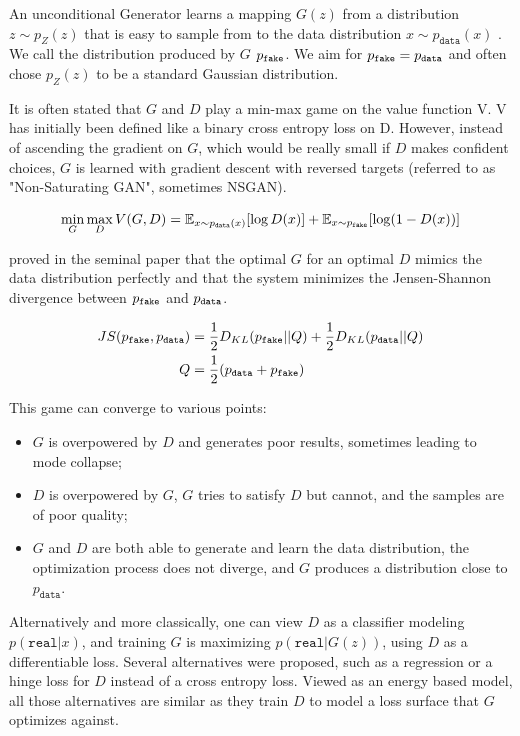 An unconditional Generator learns a mapping $G(z)$ from a distribution $z \sim p_Z(z)$ that is easy to sample from to the data distribution $x \sim p_{\texttt{data}}(x)$ \citep{gan}. We call the distribution produced by $G$ $p_\texttt{fake}$. We aim for $p_\texttt{fake} = p_\texttt{data}$ and often chose $p_Z(z)$ to be a standard Gaussian distribution.

It is often stated that $G$ and $D$ play a min-max game on the value function V. V has initially been defined like a binary cross entropy loss on D. However, instead of ascending the gradient on $G$, which would be really small if $D$ makes confident choices, $G$ is learned with gradient descent with reversed targets (referred to as "Non-Saturating GAN", sometimes NSGAN).

\begin{equation}
    \min_G \max_D V(G, D) = \mathbb{E}_{x \sim p_\texttt{data}(x)}[\log D(x)] + \mathbb{E}_{x\sim p_\texttt{fake}}[\log (1 - D(x))]
\end{equation}

\citet{gan} proved in the seminal paper that the optimal $G$ for an optimal $D$ mimics the data distribution perfectly and that the system minimizes the Jensen-Shannon divergence between $p_\texttt{fake}$ and $p_\texttt{data}$.

\begin{equation}
    \begin{split}
    JS(p_\texttt{fake}, p_\texttt{data}) &= \frac{1}{2}D_{KL}(p_\texttt{fake} || Q) + \frac{1}{2} D_{KL}(p_\texttt{data} || Q) \\
    Q&=\frac{1}{2}(p_\texttt{data} + p_\texttt{fake})
\end{split}
\end{equation}

This game can converge to various points:

\begin{itemize}
    \item $G$ is overpowered by $D$ and generates poor results, sometimes leading to mode collapse;
    \item $D$ is overpowered by $G$, $G$ tries to satisfy $D$ but cannot, and the samples are of poor quality;
    \item $G$ and $D$ are both able to generate and learn the data distribution, the optimization process does not diverge, and $G$ produces a distribution close to $p_{\texttt{data}}$.
\end{itemize}

Alternatively and more classically, one can view $D$ as a classifier modeling $p(\texttt{real}|x)$, and training $G$ is maximizing $p(\texttt{real}|G(z))$, using $D$ as a differentiable loss. Several alternatives were proposed, such as a regression or a hinge loss for $D$ instead of a cross entropy loss. Viewed as an energy based model, all those alternatives are similar as they train $D$ to model a loss surface that $G$ optimizes against.

